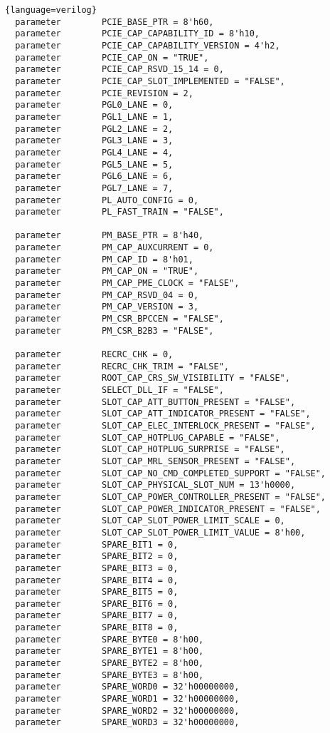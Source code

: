 \begin{lstlisting}{language=verilog}
  parameter        PCIE_BASE_PTR = 8'h60, 
  parameter        PCIE_CAP_CAPABILITY_ID = 8'h10, 
  parameter        PCIE_CAP_CAPABILITY_VERSION = 4'h2, 
  parameter        PCIE_CAP_ON = "TRUE", 
  parameter        PCIE_CAP_RSVD_15_14 = 0, 
  parameter        PCIE_CAP_SLOT_IMPLEMENTED = "FALSE", 
  parameter        PCIE_REVISION = 2, 
  parameter        PGL0_LANE = 0, 
  parameter        PGL1_LANE = 1, 
  parameter        PGL2_LANE = 2, 
  parameter        PGL3_LANE = 3, 
  parameter        PGL4_LANE = 4, 
  parameter        PGL5_LANE = 5, 
  parameter        PGL6_LANE = 6, 
  parameter        PGL7_LANE = 7, 
  parameter        PL_AUTO_CONFIG = 0, 
  parameter        PL_FAST_TRAIN = "FALSE", 

  parameter        PM_BASE_PTR = 8'h40, 
  parameter        PM_CAP_AUXCURRENT = 0, 
  parameter        PM_CAP_ID = 8'h01, 
  parameter        PM_CAP_ON = "TRUE", 
  parameter        PM_CAP_PME_CLOCK = "FALSE", 
  parameter        PM_CAP_RSVD_04 = 0, 
  parameter        PM_CAP_VERSION = 3, 
  parameter        PM_CSR_BPCCEN = "FALSE", 
  parameter        PM_CSR_B2B3 = "FALSE", 

  parameter        RECRC_CHK = 0, 
  parameter        RECRC_CHK_TRIM = "FALSE", 
  parameter        ROOT_CAP_CRS_SW_VISIBILITY = "FALSE", 
  parameter        SELECT_DLL_IF = "FALSE", 
  parameter        SLOT_CAP_ATT_BUTTON_PRESENT = "FALSE", 
  parameter        SLOT_CAP_ATT_INDICATOR_PRESENT = "FALSE", 
  parameter        SLOT_CAP_ELEC_INTERLOCK_PRESENT = "FALSE", 
  parameter        SLOT_CAP_HOTPLUG_CAPABLE = "FALSE", 
  parameter        SLOT_CAP_HOTPLUG_SURPRISE = "FALSE", 
  parameter        SLOT_CAP_MRL_SENSOR_PRESENT = "FALSE", 
  parameter        SLOT_CAP_NO_CMD_COMPLETED_SUPPORT = "FALSE", 
  parameter        SLOT_CAP_PHYSICAL_SLOT_NUM = 13'h0000, 
  parameter        SLOT_CAP_POWER_CONTROLLER_PRESENT = "FALSE", 
  parameter        SLOT_CAP_POWER_INDICATOR_PRESENT = "FALSE", 
  parameter        SLOT_CAP_SLOT_POWER_LIMIT_SCALE = 0, 
  parameter        SLOT_CAP_SLOT_POWER_LIMIT_VALUE = 8'h00, 
  parameter        SPARE_BIT1 = 0, 
  parameter        SPARE_BIT2 = 0, 
  parameter        SPARE_BIT3 = 0, 
  parameter        SPARE_BIT4 = 0, 
  parameter        SPARE_BIT5 = 0, 
  parameter        SPARE_BIT6 = 0, 
  parameter        SPARE_BIT7 = 0, 
  parameter        SPARE_BIT8 = 0, 
  parameter        SPARE_BYTE0 = 8'h00, 
  parameter        SPARE_BYTE1 = 8'h00, 
  parameter        SPARE_BYTE2 = 8'h00, 
  parameter        SPARE_BYTE3 = 8'h00, 
  parameter        SPARE_WORD0 = 32'h00000000, 
  parameter        SPARE_WORD1 = 32'h00000000, 
  parameter        SPARE_WORD2 = 32'h00000000, 
  parameter        SPARE_WORD3 = 32'h00000000, 


\end{lstlisting}
